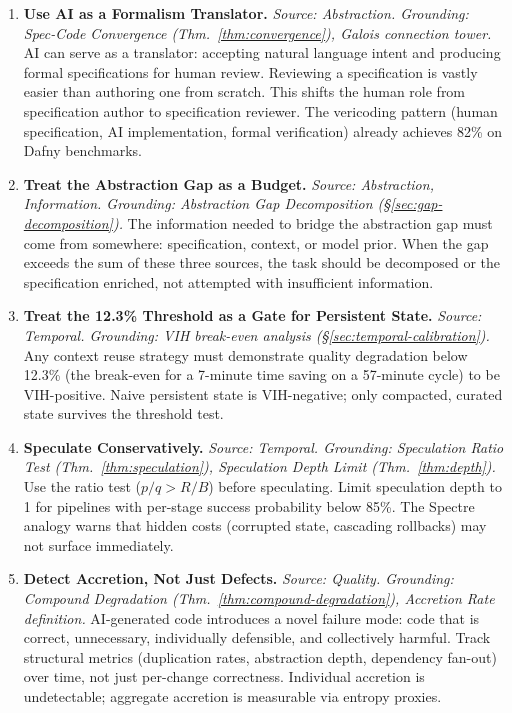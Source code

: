 \begin{enumerate}[label=\textbf{P\arabic*.}, leftmargin=3em, resume]

\item \textbf{Use AI as a Formalism Translator.}
\emph{Source: Abstraction. Grounding: Spec-Code Convergence (Thm.~\ref{thm:convergence}), Galois connection tower.}
AI can serve as a translator: accepting natural language intent and producing formal specifications for human review. Reviewing a specification is vastly easier than authoring one from scratch. This shifts the human role from specification author to specification reviewer. The vericoding pattern (human specification, AI implementation, formal verification) already achieves 82\% on Dafny benchmarks.

\item \textbf{Treat the Abstraction Gap as a Budget.}
\emph{Source: Abstraction, Information. Grounding: Abstraction Gap Decomposition (\S\ref{sec:gap-decomposition}).}
The information needed to bridge the abstraction gap must come from somewhere: specification, context, or model prior. When the gap exceeds the sum of these three sources, the task should be decomposed or the specification enriched, not attempted with insufficient information.

\item \textbf{Treat the 12.3\% Threshold as a Gate for Persistent State.}
\emph{Source: Temporal. Grounding: VIH break-even analysis (\S\ref{sec:temporal-calibration}).}
Any context reuse strategy must demonstrate quality degradation below 12.3\% (the break-even for a 7-minute time saving on a 57-minute cycle) to be VIH-positive. Naive persistent state is VIH-negative; only compacted, curated state survives the threshold test.

\item \textbf{Speculate Conservatively.}
\emph{Source: Temporal. Grounding: Speculation Ratio Test (Thm.~\ref{thm:speculation}), Speculation Depth Limit (Thm.~\ref{thm:depth}).}
Use the ratio test ($p/q > R/B$) before speculating. Limit speculation depth to 1 for pipelines with per-stage success probability below 85\%. The Spectre analogy warns that hidden costs (corrupted state, cascading rollbacks) may not surface immediately.

\item \textbf{Detect Accretion, Not Just Defects.}
\emph{Source: Quality. Grounding: Compound Degradation (Thm.~\ref{thm:compound-degradation}), Accretion Rate definition.}
AI-generated code introduces a novel failure mode: code that is correct, unnecessary, individually defensible, and collectively harmful. Track structural metrics (duplication rates, abstraction depth, dependency fan-out) over time, not just per-change correctness. Individual accretion is undetectable; aggregate accretion is measurable via entropy proxies.


\end{enumerate}
